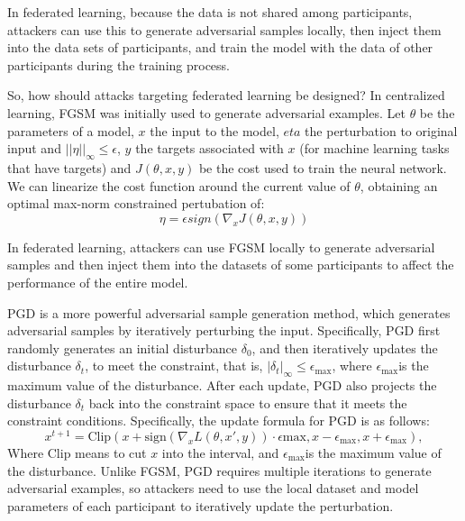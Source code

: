\documentclass[conference]{IEEEtran}
\begin{document}
In federated learning, because the data is not shared among participants,
attackers can use this to generate adversarial samples locally,
then inject them into the data sets of participants, and train
the model with the data of other participants during the training process.

So, how should attacks targeting federated learning be designed?
In centralized learning, FGSM\cite{b99} was initially used to generate adversarial examples.
Let $\theta$ be the parameters of a model, $x$ the input to the model,
$eta$ the perturbation to original input and $||\eta||_\infty \le \epsilon$,
$y$ the targets associated with $x$ (for machine learning tasks that have targets)
and $J(\theta, x, y)$ be the cost used to train the neural network.
We can linearize the cost function around the current value of $\theta$,
obtaining an optimal max-norm constrained pertubation of:
\begin{equation}
    \eta = \epsilon sign(\nabla_x J(\theta,x,y))
\end{equation}

In federated learning, attackers can use FGSM locally to generate
adversarial samples and then inject them into the datasets of some participants
to affect the performance of the entire model.

PGD\cite{b100} is a more powerful adversarial sample generation method,
which generates adversarial samples by iteratively perturbing the input.
Specifically, PGD first randomly generates an initial disturbance $\delta_0$,
and then iteratively updates the disturbance $\delta_t$, to meet the constraint,
that is, $|\delta_t|_{\infty} \leq \epsilon_{\text{max}}$,
where $\epsilon_{\text{max}}$is the maximum value of the disturbance.
After each update, PGD also projects the disturbance
$\delta_t$ back into the constraint space to ensure that it meets the
constraint conditions.
Specifically, the update formula for PGD is as follows:
\begin{equation}
    x^{t+1} = \text{Clip}(x + \text{sign}(\nabla_x L(\theta,x',y)) \cdot \epsilon{\text{max}}, x - \epsilon_{\text{max}}, x + \epsilon_{\text{max}}),
\end{equation}
Where $\text{Clip}$ means to cut $x$ into the interval, and $\epsilon_ {\text{max}} $is the maximum value of the disturbance.
Unlike FGSM, PGD requires multiple iterations to generate adversarial examples,
so attackers need to use the local dataset and model parameters of each participant
to iteratively update the perturbation.
\end{document}
